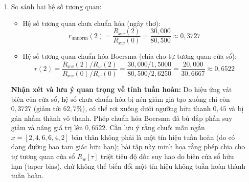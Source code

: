 \begin{enumerate}[label=\alph*)]
    \item So sánh hai hệ số tương quan:
    \begin{itemize}[leftmargin=1.5em, itemsep=2pt]
        \item Hệ số tương quan chưa chuẩn hóa (ngây thơ):
        \begin{equation}
            r_{\text{unnorm}}(2) = \frac{R_{xw}(2)}{R_{xw}(0)} = \frac{30{,}000}{80{,}500} \approx 0{,}3727
        \end{equation}
        \item Hệ số tương quan chuẩn hóa Boersma (chia cho tự tương quan cửa sổ):
        \begin{equation}
            r(2) = \frac{R_{xw}(2) / R_w(2)}{R_{xw}(0) / R_w(0)} = \frac{30{,}000 / 1{,}5000}{80{,}500 / 2{,}6250} = \frac{20{,}000}{30{,}6667} \approx 0{,}6522
        \end{equation}
    \end{itemize}
    \textbf{Nhận xét và lưu ý quan trọng về tính tuần hoàn:} Do hiệu ứng vát biên của cửa sổ, hệ số chưa chuẩn hóa bị nén giảm giả tạo xuống chỉ còn $0{,}3727$ (giảm tới $62{,}7\%$), có thể rơi xuống dưới ngưỡng hữu thanh $0{,}45$ và bị gán nhầm thành vô thanh. Phép chuẩn hóa Boersma đã bù đắp phần suy giảm và nâng giá trị lên $0{,}6522$. Cần lưu ý rằng chuỗi mẫu ngắn $x = [2, 4, 6, 6, 4, 2]$ bản thân không phải là một tín hiệu tuần hoàn (do có dạng đường bao tam giác hữu hạn); bài tập này minh họa rằng phép chia cho tự tương quan cửa sổ $R_w[\tau]$ triệt tiêu độ dốc suy hao do biên cửa sổ hữu hạn (taper bias), chứ không thể biến đổi một tín hiệu không tuần hoàn thành tuần hoàn.
\end{enumerate}

